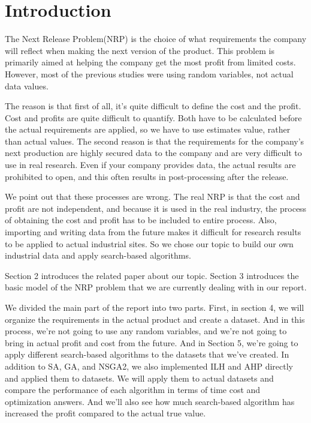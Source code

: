 \section{Introduction}
 The Next Release Problem(NRP) is the choice of what requirements the company will reflect when making the next version of the product. This problem is primarily aimed at helping the company get the most profit from limited costs. However, most of the previous studies were using random variables, not actual data values. 
 
 The reason is that first of all, it's quite difficult to define the cost and the profit. Cost and profits are quite difficult to quantify. Both have to be calculated before the actual requirements are applied, so we have to use estimates value, rather than actual values. The second reason is that the requirements for the company's next production are highly secured data to the company and are very difficult to use in real research. Even if your company provides data, the actual results are prohibited to open, and this often results in post-processing after the release.
 
 We point out that these processes are wrong. The real NRP is that the cost and profit are not independent, and because it is used in the real industry, the process of obtaining the cost and profit has to be included to entire process. Also, importing and writing data from the future makes it difficult for research results to be applied to actual industrial sites. So we chose our topic to build our own industrial data and apply search-based algorithms. 
 
Section 2 introduces the related paper about our topic. Section 3 introduces the basic model of the NRP problem that we are currently dealing with in our report.

We divided the main part of the report into two parts. First, in section 4, we will organize the requirements in the actual product and create a dataset. And in this process, we're not going to use any random variables, and we're not going to bring in actual profit and cost from the future. 
And in Section 5, we're going to apply different search-based algorithms to the datasets that we've created. In addition to SA, GA, and NSGA2, we also implemented ILH and AHP directly and applied them to datasets. We will apply them to actual datasets and compare the performance of each algorithm in terms of time cost and optimization answers. And we'll also see how much search-based algorithm has increased the profit compared to the actual true value.

